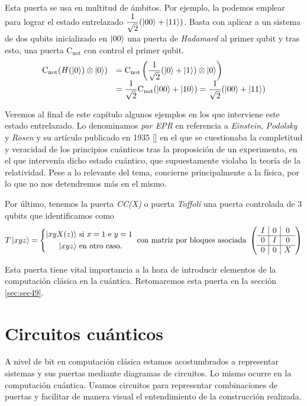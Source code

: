 Esta puerta se usa en multitud de ámbitos. Por ejemplo,  la podemos emplear  para lograr el estado entrelazado $\dfrac{1}{\sqrt{2}}(\left|00\right\rangle+\left|11\right\rangle)$. Basta con aplicar a un sistema de dos qubits inicializado en $\left|00\right\rangle$ una puerta de \textit{Hadamard} al primer qubit y tras esto, una puerta C$_\textrm{not}$ con control el primer qubit.
%
$$\begin{array}{ll}
\mathrm{C_{not}}(H(\left|0\right\rangle)\otimes\left|0\right\rangle)&=\mathrm{C_{not}}\left(\dfrac{1}{\sqrt{2}}(\left|0\right\rangle+\left|1\right\rangle)\otimes\left|0\right\rangle\right)\\
&=\dfrac{1}{\sqrt{2}}\mathrm{C_{not}}(\left|00\right\rangle+\left|10\right\rangle)=\dfrac{1}{\sqrt{2}}(\left|00\right\rangle+\left|11\right\rangle)
\end{array}
$$

Veremos al final de este capítulo algunos ejemplos en los que interviene este estado entrelazado. Lo denominamos \textit{par EPR} en referencia a \textit{Einstein}, \textit{Podolsky} y \textit{Rosen} y su artículo publicado en 1935 [\cite{einstein1935can}] en el que se cuestionaba la completitud y veracidad de los principios cuánticos tras la proposición de un experimento, en el que intervenía dicho estado cuántico, que supuestamente violaba la teoría de la relatividad. Pese a lo relevante del tema, concierne principalmente a la física, por lo que no nos detendremos más en el mismo.

Por último, tenemos la puerta \textit{CC(X)} o puerta \textit{Toffoli} una puerta controlada de 3 qubits que identificamos como
\[T\ket{xyz}=\left\{\begin{aligned}
\ket{xyX(z)}&\mathrm{\ si\ } x=1\mathrm{\ e\ } y=1\\
\ket{xyz}&\mathrm{\ en\ otro\ caso.}\end{aligned}\right. \mathrm{\ con\ matriz\ por\ bloques\ asociada\ }\left(\begin{array}{c|c|c}I&0&0\\\hline0&I&0\\\hline0&0&X\end{array}\right)\]

Esta puerta tiene vital importancia a la hora de introducir elementos de la computación clásica en la cuántica. Retomaremos esta puerta en la sección \ref{sec:sec49}.

\section{Circuitos cuánticos}

A nivel de bit en computación clásica estamos acostumbrados a representar sistemas y sus puertas mediante diagramas de circuitos. Lo mismo ocurre en la computación cuántica. Usamos circuitos para representar combinaciones de puertas y facilitar de manera visual el entendimiento de la construcción realizada.

